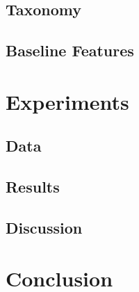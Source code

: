 \documentclass[runningheads]{llncs}
\begin{document}
\subsection{Taxonomy}
\subsection{Baseline Features}
\section{Experiments}
\subsection{Data}
\subsection{Results}
\subsection{Discussion}
\section{Conclusion}



\end{document}
